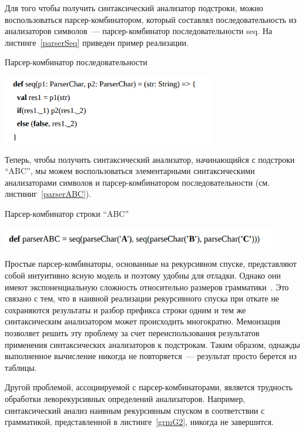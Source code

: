 Для того чтобы получить синтаксический анализатор подстроки, можно воспользоваться парсер-комбинатором,
который составлял последовательность из анализаторов символов~--- парсер-комбинатор последовательности seq. На листинге~\ref{parserSeq} приведен пример реализации.

\begin{listing}
\caption{Парсер-комбинатор последовательности}
\label{parserSeq}
\centering
\includegraphics[width=0.7\textwidth]{Smolina/pics/parserSeq.png}
\end{listing}

Теперь, чтобы получить синтаксический анализатор, начинающийся с подстроки ``ABC'', мы можем воспользоваться элементарными синтаксическими анализаторами символов и парсер-комбинатором последовательности (см. листиниг~\ref{parserABC}).

\begin{listing}
\caption{Парсер-комбинатор строки “ABC”}
\label{parserABC}
\centering
\includegraphics[width=0.9\textwidth]{Smolina/pics/parserABC.png}
\end{listing}

Простые парсер-комбинаторы, основанные на рекурсивном спуске, представляют собой интуитивно ясную модель и поэтому удобны для
отладки. Однако они имеют экспоненциальную сложность относительно размеров грамматики~\cite{Popov}. Это связано с тем, что в наивной реализации рекурсивного спуска при откате не сохраняются результаты и разбор префикса строки одним и тем же синтаксическим анализатором может происходить многократно. Мемоизация~\cite{Memoization} позволяет решить эту проблему за счет переиспользования результатов применения синтаксических анализаторов к подстрокам. Таким образом, однажды выполненное вычисление никогда не повторяется~--- результат просто берется из таблицы.

Другой проблемой, ассоциируемой с парсер-комбинаторами, является трудность обработки леворекурсивных определений анализаторов. Например, синтаксический анализ наивным рекурсивным спуском в соответствии с грамматикой, представленной в листинге~\ref{grmG2}, никогда не завершится.

